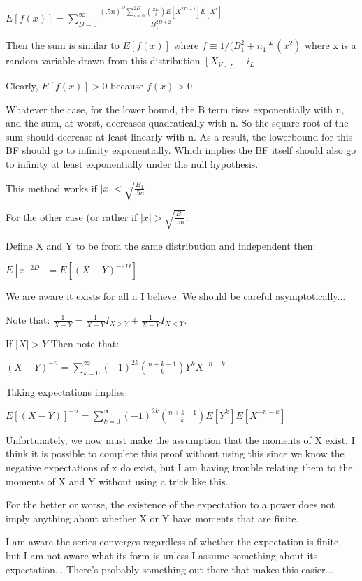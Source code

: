 \documentclass[11pt]{article}
\begin{document}
$E[f(x)] = \sum_{D=0}^\infty \frac{(.5n)^D \sum_{i=0}^{2D} \binom{2D}{i}E[X^{2D-i}]E[X^{i}]}{B_1^{2D+2}}$

Then the sum is similar to $E[f(x)]$ where $f \equiv 1 / (B_1^2 + n_1*(x^2)$ where x is a random variable drawn from this distribution $[X_V]_{L} - i_L$

Clearly, $E[f(x)] > 0$ because $f(x) > 0$

Whatever the case, for the lower bound, the B term rises exponentially with n, and the sum, at worst, decreases quadratically with n. So the square root of the sum should decrease at least linearly with n. As a result, the lowerbound for this BF should go to infinity exponentially. Which implies the BF itself should also go to infinity at least exponentially under the null hypothesis.

This method works if $|x| < \sqrt{\frac{B_1}{.5n}} $. 

For the other case (or rather if $|x| > \sqrt{\frac{B_1}{.5n}} $:

Define X and Y to be from the same distribution and independent then:

$E[x^{-2D}] = E[(X-Y)^{-2D}]$

We are aware it exists for all n I believe. We should be careful asymptotically...

Note that: $\frac{1}{X-Y} = \frac{1}{X-Y} I_{X > Y} + \frac{1}{X-Y} I_{X < Y}$. 

If $|X| > Y$ Then note that:

$(X - Y)^{-n} = \sum_{k=0}^{\infty} (-1)^{2k} \binom{n+k-1}{k}{Y^k}{X^{-n-k}}$

Taking expectations implies:

$E[(X - Y)]^{-n} = \sum_{k=0}^{\infty} (-1)^{2k} \binom{n+k-1}{k}E[{Y^k}]E[{X^{-n-k}}]$

Unfortunately, we now must make the assumption that the moments of X exist. I think it is possible to complete this proof without using this since we know the negative expectations of x do exist, but I am having trouble relating them to the moments of X and Y without using a trick like this.

For the better or worse, the existence of the expectation to a power does not imply anything about whether X or Y have moments that are finite.

I am aware the series converges regardless of whether the expectation is finite, but I am not aware what its form is unless I assume something about its expectation... There's probably something out there that makes this easier...
\end{document}
